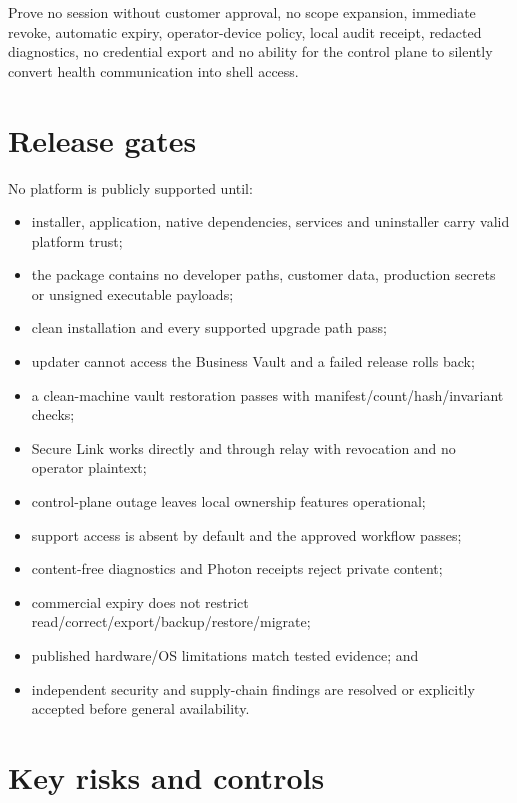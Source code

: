 \documentclass[11pt]{article}
\begin{document}
Prove no session without customer approval, no scope expansion, immediate revoke, automatic expiry, operator-device policy, local audit receipt, redacted diagnostics, no credential export and no ability for the control plane to silently convert health communication into shell access.

\section{Release gates}

No platform is publicly supported until:

\begin{itemize}
  \item installer, application, native dependencies, services and uninstaller carry valid platform trust;
  \item the package contains no developer paths, customer data, production secrets or unsigned executable payloads;
  \item clean installation and every supported upgrade path pass;
  \item updater cannot access the Business Vault and a failed release rolls back;
  \item a clean-machine vault restoration passes with manifest/count/hash/invariant checks;
  \item Secure Link works directly and through relay with revocation and no operator plaintext;
  \item control-plane outage leaves local ownership features operational;
  \item support access is absent by default and the approved workflow passes;
  \item content-free diagnostics and Photon receipts reject private content;
  \item commercial expiry does not restrict read/correct/export/backup/restore/migrate;
  \item published hardware/OS limitations match tested evidence; and
  \item independent security and supply-chain findings are resolved or explicitly accepted before general availability.
\end{itemize}

\section{Key risks and controls}
\end{document}

